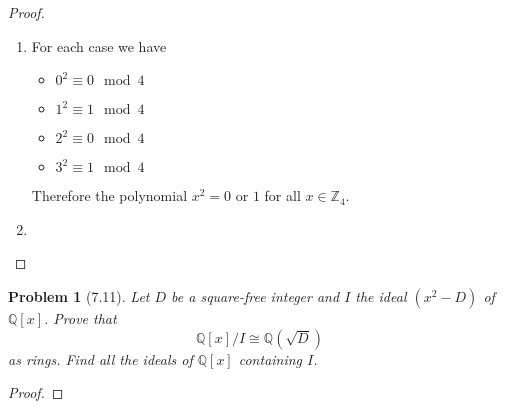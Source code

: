 \documentclass[10pt]{article}
\newcommand{\sk}{\vskip 10mm}
\newcommand{\bb}[1]{\mathbb{#1}}
\theoremstyle{plain}
\newtheorem{problem}{Problem}
\theoremstyle{remark}
\begin{document}
\begin{proof}
  \begin{enumerate}
  \item For each case we have
    \begin{itemize}
    \item $0^2\equiv 0 \mod 4$
    \item $1^2\equiv 1 \mod 4$
    \item $2^2\equiv 0 \mod 4$
    \item $3^2\equiv 1 \mod 4$
    \end{itemize}
    Therefore the polynomial $x^2=0$ or $1$ for all $x\in\bb{Z}_4$.
  \item
  \end{enumerate}
\end{proof}

\sk

\begin{problem}[7.11]
  Let $D$ be a square-free integer and $I$ the ideal $(x^2-D)$ of $\bb{Q}[x]$.
  Prove that
  \[ \bb{Q}[x]/I\cong\bb{Q}(\sqrt{D}) \]
  as rings. Find all the ideals of $\bb{Q}[x]$ containing $I$.
\end{problem}

\begin{proof}
  
\end{proof}

\sk

\end{document}
